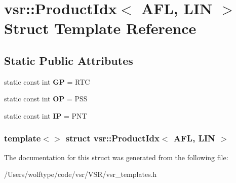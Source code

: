 \hypertarget{structvsr_1_1_product_idx_3_01_a_f_l_00_01_l_i_n_01_4}{\section{vsr\-:\-:Product\-Idx$<$ A\-F\-L, L\-I\-N $>$ Struct Template Reference}
\label{structvsr_1_1_product_idx_3_01_a_f_l_00_01_l_i_n_01_4}
}
\subsection*{Static Public Attributes}
\begin{DoxyCompactItemize}
\item 
\hypertarget{structvsr_1_1_product_idx_3_01_a_f_l_00_01_l_i_n_01_4_aaf9161fbf444369fcd921e2155627acc}{static const int {\bfseries G\-P} = R\-T\-C}\label{structvsr_1_1_product_idx_3_01_a_f_l_00_01_l_i_n_01_4_aaf9161fbf444369fcd921e2155627acc}

\item 
\hypertarget{structvsr_1_1_product_idx_3_01_a_f_l_00_01_l_i_n_01_4_a8b3db16cd626b1ec79611ae7649944db}{static const int {\bfseries O\-P} = P\-S\-S}\label{structvsr_1_1_product_idx_3_01_a_f_l_00_01_l_i_n_01_4_a8b3db16cd626b1ec79611ae7649944db}

\item 
\hypertarget{structvsr_1_1_product_idx_3_01_a_f_l_00_01_l_i_n_01_4_a8f4e849dcb0704af7e28f9964fb93674}{static const int {\bfseries I\-P} = P\-N\-T}\label{structvsr_1_1_product_idx_3_01_a_f_l_00_01_l_i_n_01_4_a8f4e849dcb0704af7e28f9964fb93674}

\end{DoxyCompactItemize}
\subsubsection*{template$<$$>$ struct vsr\-::\-Product\-Idx$<$ A\-F\-L, L\-I\-N $>$}



The documentation for this struct was generated from the following file\-:\begin{DoxyCompactItemize}
\item 
/\-Users/wolftype/code/vsr/\-V\-S\-R/vsr\-\_\-templates.\-h\end{DoxyCompactItemize}
